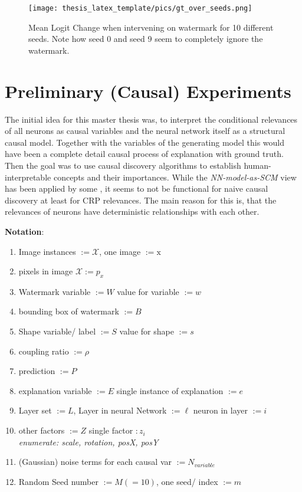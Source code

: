 \begin{figure}
    \centering
    \texttt{[image: thesis\_latex\_template/pics/gt\_over\_seeds.png]}
    \caption{Mean Logit Change when intervening on watermark for 10 different seeds. Note how seed 0 and seed 9 seem to completely ignore the watermark.}
    \label{fig:gt_over_seeds}
\end{figure}

{ \color{gray}
\section{Preliminary (Causal) Experiments}
The initial idea for this master thesis was, to interpret the conditional relevances of all neurons as causal variables and the neural network itself as a structural causal model. Together with the variables of the generating model this would have been a complete detail causal process of explanation with ground truth. Then the goal was to use causal discovery algorithms to establish human-interpretable concepts and their importances. While the \textit{NN-model-as-SCM} view has been applied by some \cite{Narendra2018,Chattopadhyay2019}, it seems to not be functional for naive causal discovery at least for CRP relevances. The main reason for this is, that the relevances of neurons have deterministic relationships with each other. 
} 
{\color{codepurple} 
\textbf{Notation}:
\begin{enumerate}
    \item Image instances $:= \mathcal{X}$, one image $:= \mathrm{x}$
    \item pixels in image $\mathcal{X} := p_x$
    \item Watermark variable $:= W$ value for variable $:= w$
    \item bounding box of watermark $:= B$
    \item Shape variable/ label $:= S$ value for shape $:= s$
    \item coupling ratio $:= \rho$
    \item prediction $:= P$
    \item explanation variable $:= E$ single instance of explanation $:= e$
    \item Layer set $:= L$, Layer in neural Network $:= \ell$ neuron in layer $:= i$
    \item other factors $:= Z$ single factor $:z_i$ \\ 
    \textit{enumerate: scale, rotation, posX, posY}
    \item (Gaussian) noise terms for each causal var $:= N_{variable}$
    \item Random Seed number $:= M (=10)$, one seed/ index $:=m$
\end{enumerate}


}